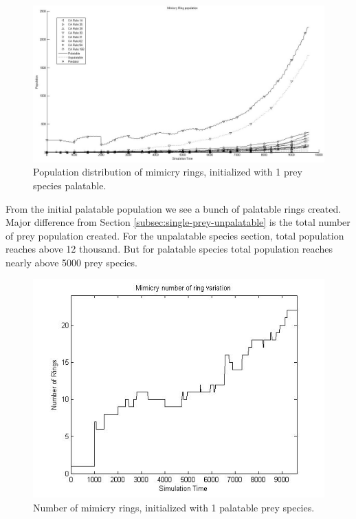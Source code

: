 \begin{figure}[H]
	\centering
	\includegraphics[scale=0.40]{images/simTime9k-1-p}
	\caption[Population distribution of mimicry rings (1 prey species palatable)]{Population distribution of mimicry rings, initialized with 1 prey species palatable.}
	\label{fig:plot-1-prey-p}
\end{figure}

From the initial palatable population we see a bunch of palatable rings created. Major difference from Section \ref{subsec:single-prey-unpalatable} is the total number of prey population created. For the unpalatable species section, total population reaches above 12 thousand. But for palatable species total population reaches nearly above 5000 prey species.

\begin{figure}[H]
	\centering
	\includegraphics[scale=0.50]{images/ringSize8k-1Prey-p}
	\caption[Number of mimicry rings (1 palatable prey species)]{Number of mimicry rings, initialized with 1 palatable prey species.}
	\label{fig:ringSize8k-1-Prey-p}
\end{figure}

